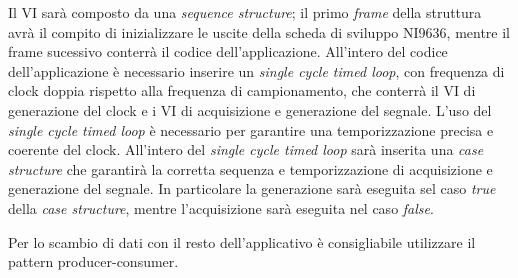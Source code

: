 Il VI sarà composto da una \textit{sequence structure}; il primo \textit{frame} della struttura avrà il compito di inizializzare le uscite della scheda di sviluppo NI9636, mentre il frame sucessivo conterrà il codice dell'applicazione.
All'intero del codice dell'applicazione è necessario inserire un \textit{single cycle timed loop}, con frequenza di clock doppia rispetto alla frequenza di campionamento, che conterrà il VI di generazione del clock e i VI di acquisizione e generazione del segnale. L'uso del \textit{single cycle timed loop} è necessario per garantire una temporizzazione precisa e coerente del clock.
All'intero del \textit{single cycle timed loop} sarà inserita una \textit{case structure} che garantirà la corretta sequenza e temporizzazione di acquisizione e generazione del segnale. In particolare la generazione sarà eseguita sel caso \textit{true} della \textit{case structure}, mentre l'acquisizione sarà eseguita nel caso \textit{false}.

Per lo scambio di dati con il resto dell'applicativo è consigliabile utilizzare il pattern producer-consumer.




